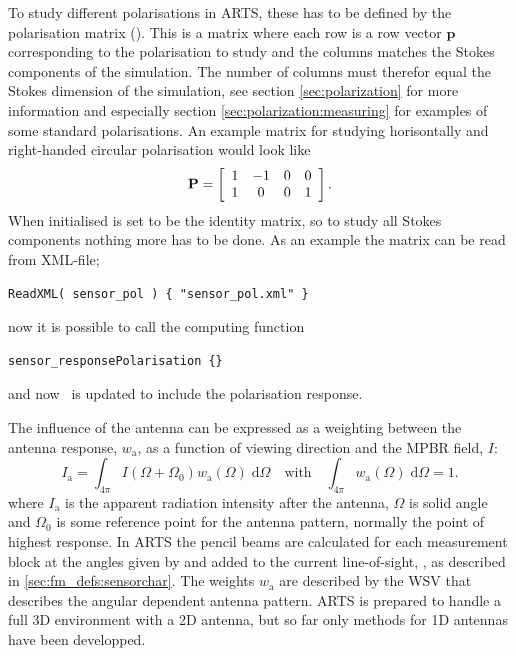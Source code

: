 To study different polarisations in ARTS, these has to be defined by the polarisation matrix  (). This is a matrix where each row is a row vector $\mathbf{p}$ corresponding to the polarisation to study and the columns matches the Stokes components of the simulation. The number of columns must therefor equal the Stokes dimension of the simulation, see section \ref{sec:polarization} for more information and especially section \ref{sec:polarization:measuring} for examples of some standard polarisations. An example matrix for studying horisontally and right-handed circular polarisation would look like
\begin{displaymath}
  \mathbf{P} = \left[ \begin{array}{c c c c}
  1 & -1 & 0 & 0 \\ 1 & 0 & 0 & 1 \\ 
  \end{array} \right].
\end{displaymath}
When initialised  is set to be the identity matrix, so to study all Stokes
components nothing more has to be done. As an example the  matrix can be read from XML-file;
\begin{verbatim}
ReadXML( sensor_pol ) { "sensor_pol.xml" }
\end{verbatim}
now it is possible to call the computing function
\begin{verbatim}
sensor_responsePolarisation {}
\end{verbatim}
and now \SnsMtr\ is updated to include the polarisation response.

\label{sec:sensor:antenna}
The influence of the antenna can be expressed as a weighting between the antenna response, $w_\mathrm{a}$, as a function of viewing direction and the MPBR field, $I$:
\begin{equation}
  I_\mathrm{a} = \int_{4\pi}\!\!\!\!I(\Omega+\Omega_0) 
  w_\mathrm{a}(\Omega) \; \mathrm{d}\Omega
  \quad \textrm{with} \quad 
  \int_{4\pi}\!\!\!\!w_\mathrm{a}(\Omega)\;\mathrm{d}\Omega = 1.
\end{equation} 
where $I_\mathrm{a}$ is the apparent radiation intensity after the antenna,
$\Omega$ is solid angle and $\Omega_0$ is some reference point for the
antenna pattern, normally the point of highest response.
In ARTS the pencil beams are calculated for each measurement block at the angles
given by  and  added to the current line-of-sight, , as described in \ref{sec:fm_defs:sensorchar}. The weights  $w_\mathrm{a}$ are described by the WSV  that describes the angular dependent antenna pattern. 
ARTS is prepared to handle a full 3D environment with a 2D antenna, but so far only methods for 1D antennas have been developped. 

